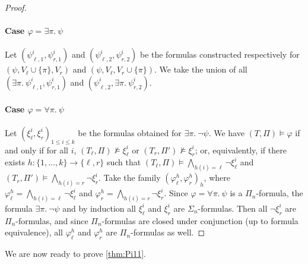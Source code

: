 \documentclass[dvipsnames,10pt,a4paper]{amsart}
\theoremstyle{definition}
\theoremstyle{remark}
\newcommand\Tl{T_\ell}
\newcommand\Tr {T_r}
\newcommand\Vl{V_\ell}
\newcommand\Vr{V_r}
\begin{document}
\begin{proof}
  \paragraph{Case $\varphi = \exists \pi.\ \psi$}
  Let $(\psi^i_{\ell,1},\psi^i_{r,1})$ and $(\psi^i_{\ell,2},\psi^i_{r,2})$
  be the formulas constructed respectively for
  $(\psi,\Vl \cup \{\pi\},\Vr)$ and $(\psi,\Vl,\Vr \cup \{\pi\})$.
  We take the union of all $(\exists \pi.\ \psi^i_{\ell,1},\psi^i_{r,1})$
  and $(\psi^i_{\ell,2},\exists \pi.\ \psi^i_{r,2})$.

  \paragraph{Case $\varphi = \forall \pi.\ \psi$}
  Let $(\xi^i_{\ell},\xi^i_{r})_{1 \le i \le k}$ be the formulas obtained for
  $\exists \pi.\ \lnot \psi$.
  We have ${(T,\Pi) \models \varphi}$ if and only if for all $i$,
  $(\Tl,\Pi) \not\models \xi^i_{\ell}$ or $(\Tr ,\Pi') \not\models \xi^i_r$;
  or, equivalently, if there exists $h: \{1,\ldots,k\} \to  \{\ell,r\}$ such
  that $(\Tl,\Pi) \models \bigwedge_{h(i) = \ell} \lnot \xi^i_{\ell}$ and
  $(\Tr ,\Pi') \models \bigwedge_{h(i) = r} \lnot \xi^i_{r}$.
  Take the family $(\varphi^h_{\ell},\varphi^h_{r})_h$, where
  $\varphi^h_{\ell} = \bigwedge_{h(i) = \ell} \lnot \xi^i_{\ell}$ and
  $\varphi^h_{r} = \bigwedge_{h(i) = r} \lnot \xi^i_{r}$.
  Since $\varphi = \forall \pi.\ \psi$ is a $\Pi_n$-formula,
  the formula $\exists \pi.\ \lnot \psi$ and by induction all
  $\xi^i_{\ell}$ and $\xi^i_{r}$ are $\Sigma_n$-formulas.
  Then all $\lnot \xi^i_{r}$ are $\Pi_n$-formulas, and since
  $\Pi_n$-formulas are closed under conjunction
  (up to formula equivalence), all $\varphi^h_{\ell}$ and $\varphi^h_{r}$
  are $\Pi_n$-formulas as well.
\end{proof}


We are now ready to prove \autoref{thm:Pi11}. 
\end{document}
